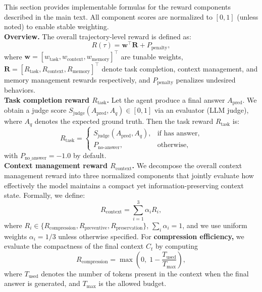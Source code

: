This section provides implementable formulas for the reward components described in the main text. All component scores are normalized to \([0,1]\) (unless noted) to enable stable weighting.
\\
\textbf{Overview.} The overall trajectory-level reward is defined as:
\begin{equation}
R(\tau) = \mathbf{w}^\top \mathbf{R} + P_{\text{penalty}},
\end{equation}
where $\mathbf{w} = [w_{\text{task}}, w_{\text{context}}, w_{\text{memory}}]^\top$ are tunable weights, $\mathbf{R} = [R_{\text{task}}, R_{\text{context}}, R_{\text{memory}}]^\top$ denote task completion, context management, and memory management rewards respectively, and $P_{\text{penalty}}$ penalizes undesired behaviors.
\\
\textbf{Task completion reward \(R_{\text{task}}\).}
Let the agent produce a final answer \(A_{\text{pred}}\). We obtain a judge score \(S_{\text{judge}}(A_{\text{pred}}, A_{q})\in[0,1]\) via an evaluator (LLM judge), where $A_{q}$ denotes the expected ground truth. Then the task reward $R_{\text{task}}$ is:
\begin{equation}
R_{\text{task}}
=
\begin{cases}
S_{\text{judge}}(A_{\text{pred}}, A_{q}),
& \text{if has answer}, \\
P_{\text{no-answer}},
& \text{otherwise},
\end{cases}
\end{equation}
with \(P_{\text{no\_answer}}=-1.0\) by default.
\\
\textbf{Context management reward \(R_{\text{context}}\).}
We decompose the overall context management reward into three normalized components that jointly evaluate how effectively the model maintains a compact yet information-preserving context state. Formally, we define: 
\begin{equation}
R_{\text{context}} = \sum_{i=1}^{3} \alpha_i R_i,
\end{equation}
where $R_i \in \{R_{\text{compression}}, R_{\text{preventive}}, R_{\text{preservation}}\}$, $\sum_i \alpha_i = 1$, and we use uniform weights $\alpha_i = 1/3$ unless otherwise specified. For \textbf{compression efficiency,} we evaluate the compactness of the final context $C_t$ by computing
\begin{equation}
R_{\text{compression}}
= \max\!\left(0,\; 1 - \frac{T_{\text{used}}}{T_{\text{max}}}\right),
\end{equation}
where $T_{\text{used}}$ denotes the number of tokens present in the context when the final answer is generated, and $T_{\text{max}}$ is the allowed budget.
